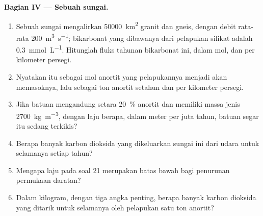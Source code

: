 \begin{problem}
\medskip
\noindent\textbf{Bagian IV --- Sebuah sungai.}
\begin{enumerate}[resume]
  \item Sebuah sungai mengalirkan \qty{50000}{km^2} granit dan gneis, dengan debit rata-rata \qty{200}{m^3.s^{-1}}; bikarbonat yang dibawanya dari pelapukan silikat adalah \qty{0.3}{mmol.L^{-1}}. Hitunglah fluks tahunan bikarbonat ini, dalam mol, dan per kilometer persegi.
  \item Nyatakan itu sebagai mol anortit yang pelapukannya menjadi  akan memasoknya, lalu sebagai ton anortit setahun dan per kilometer persegi.
  \item Jika batuan mengandung setara \qty{20}{\percent} anortit dan memiliki massa jenis \qty{2700}{kg.m^{-3}}, dengan laju berapa, dalam meter per juta tahun, batuan segar itu sedang terkikis?
  \item Berapa banyak karbon dioksida yang dikeluarkan sungai ini dari udara untuk selamanya setiap tahun?
  \item Mengapa laju pada soal 21 merupakan batas bawah bagi penurunan permukaan daratan?
  \item Dalam kilogram, dengan tiga angka penting, berapa banyak karbon dioksida yang ditarik untuk selamanya oleh pelapukan satu ton anortit?
\end{enumerate}
\end{problem}
